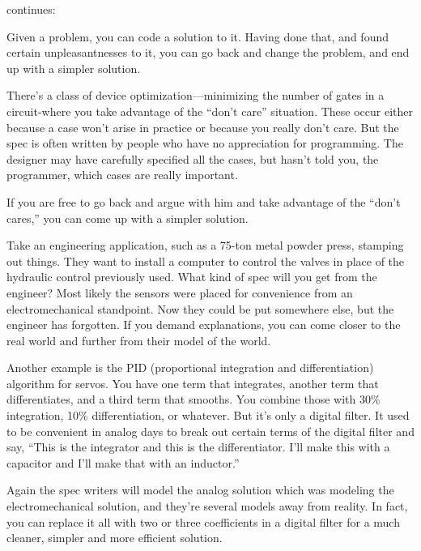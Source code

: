 \begin{interview}
 continues:
\begin{tfquot}

Given a problem, you can code a solution to it. Having done that, and found
certain unpleasantnesses to it, you can go back and change the problem,
and end up with a simpler solution.

There's a class of device optimization---minimizing the number of gates in a
circuit-where you take advantage of the ``don't care'' situation. These
occur either because a case won't arise in practice or because you really
don't care. But the spec is often written by people who have no appreciation
for programming. The designer may have carefully specified all the cases,
but hasn't told you, the programmer, which cases are really important.

If you are free to go back and argue with him and take advantage of the
``don't cares,'' you can come up with a simpler solution.

Take an engineering application, such as a 75-ton metal powder press,
stamping out things. They want to install a computer to control the
valves in place of the hydraulic control previously used. What kind of
spec will you get from the engineer? Most likely the sensors were
placed for convenience from an electromechanical standpoint. Now they
could be put somewhere else, but the engineer has forgotten. If you
demand explanations, you can come closer to the real world and further
from their model of the world.

Another example is the PID (proportional integration and
differentiation) algorithm for servos. You have one term that
integrates, another term that differentiates, and a third term that
smooths. You combine those with 30\% integration, 10\%
differentiation, or whatever. But it's only a digital filter. It used
to be convenient in analog days to break out certain terms of the
digital filter and say, ``This is the integrator and this is the
differentiator. I'll make this with a capacitor and I'll make that
with an inductor.''

Again the spec writers will model the analog solution which was
modeling the electromechanical solution, and they're several models
away from reality. In fact, you can replace it all with two or three
coefficients in a digital filter for a much cleaner, simpler and more
efficient solution.
\end{tfquot}
\end{interview}

